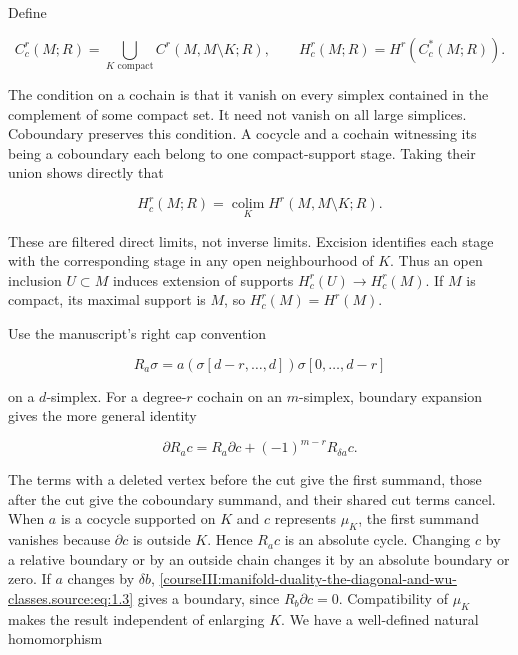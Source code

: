 Define

\begin{equation}
C_c^r(M;R)=\bigcup_{K\text{ compact}} C^r(M,M\setminus K;R),
\qquad H_c^r(M;R)=H^r(C_c^*(M;R)).
\label{courseIII:manifold-duality-the-diagonal-and-wu-classes.source:eq:1.1}
\end{equation}

The condition on a cochain is that it vanish on every simplex contained in the complement of some compact set. It need not vanish on all large simplices. Coboundary preserves this condition. A cocycle and a cochain witnessing its being a coboundary each belong to one compact-support stage. Taking their union shows directly that

\begin{equation}
H_c^r(M;R)=\underset{K}{\operatorname{colim}}H^r(M,M\setminus K;R).
\label{courseIII:manifold-duality-the-diagonal-and-wu-classes.source:eq:1.2}
\end{equation}

These are filtered direct limits, not inverse limits. Excision identifies each stage with the corresponding stage in any open neighbourhood of \(K\). Thus an open inclusion \(U\subset M\) induces extension of supports \(H_c^r(U)\to H_c^r(M)\). If \(M\) is compact, its maximal support is \(M\), so \(H_c^r(M)=H^r(M)\).

Use the manuscript's right cap convention

\[
R_a\sigma=a(\sigma[d-r,\ldots,d])\sigma[0,\ldots,d-r]
\]

on a \(d\)-simplex. For a degree-\(r\) cochain on an \(m\)-simplex, boundary expansion gives the more general identity

\begin{equation}
\partial R_a c=R_a\partial c+(-1)^{m-r}R_{\delta a}c.
\label{courseIII:manifold-duality-the-diagonal-and-wu-classes.source:eq:1.3}
\end{equation}

The terms with a deleted vertex before the cut give the first summand, those after the cut give the coboundary summand, and their shared cut terms cancel. When \(a\) is a cocycle supported on \(K\) and \(c\) represents \(\mu_K\), the first summand vanishes because \(\partial c\) is outside \(K\). Hence \(R_a c\) is an absolute cycle. Changing \(c\) by a relative boundary or by an outside chain changes it by an absolute boundary or zero. If \(a\) changes by \(\delta b\), \eqref{courseIII:manifold-duality-the-diagonal-and-wu-classes.source:eq:1.3} gives a boundary, since \(R_b\partial c=0\). Compatibility of \(\mu_K\) makes the result independent of enlarging \(K\). We have a well-defined natural homomorphism

